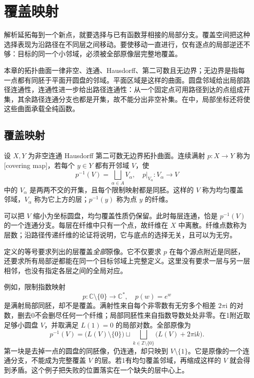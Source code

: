 \section{覆盖映射}
\label{b3:sec:1101}

解析延拓每到一个新点，就要选择与已有函数芽相接的局部分支。覆盖空间把这种选择表现为沿路径在不同层之间移动。要使移动一直进行，仅有逐点的局部逆还不够：目标的同一个小邻域，必须被全部原像层完整地覆盖。

\ProseParagraphBreak
本章的拓扑曲面一律非空、连通、Hausdorff、第二可数且无边界；无边界是指每一点都有同胚于平面开圆盘的邻域。平面区域是这样的曲面。圆盘邻域给出局部路径连通性，连通性进一步给出路径连通性：从一个固定点可用路径到达的点组成开集，其余路径连通分支也都是开集，故不能分出非空补集。在中，局部坐标还将使这些曲面承载全纯函数。

\subsection{覆盖映射}
\label{b3:subsec:110101}

\begin{definition}\label{b3:def:11-covering}
设 \(X,Y\) 为非空连通 Hausdorff 第二可数无边界拓扑曲面。连续满射 \(p:X\to Y\) 称为[covering map]，若每个 \(y\in Y\) 都有开邻域 \(V\)，使
\[
 p^{-1}(V)=\bigsqcup_{\alpha\in A}V_\alpha,
 \quad p|_{V_\alpha}:V_\alpha\longrightarrow V
\]
中的 \(V_\alpha\) 是两两不交的开集，且每个限制映射都是同胚。这样的 \(V\) 称为均匀覆盖邻域，\(V_\alpha\) 称为它上方的层；\(p^{-1}(y)\) 称为点 \(y\) 的纤维。
\end{definition}
可以把 \(V\) 缩小为坐标圆盘，均匀覆盖性质仍保留。此时每层连通，恰是 \(p^{-1}(V)\) 的一个连通分支。每层在纤维中只有一个点，故纤维在 \(X\) 中离散。纤维点数称为层数；沿路径传递纤维的论证将说明，它与底点的选择无关，且可以为无穷。

\ProseParagraphBreak
定义的等号要求列出的层覆盖\emph{全部}原像。它不仅要求 \(p\) 在每个源点附近是同胚，还要求所有局部逆都能在同一个目标邻域上完整定义。这里没有要求一层与另一层相邻，也没有指定各层之间的全局对应。

\ProseParagraphBreak
例如，限制指数映射
\[
 p:\mathbb C\setminus\{0\}\longrightarrow\mathbb C^*,
 \quad p(w)=e^w
\]
是满射局部同胚，却不是覆盖。满射性来自每个非零数有无穷多个相差 \(2\pi\mathrm i\) 的对数，删去0不会删尽任何一个纤维；局部同胚性来自指数导数处处非零。在1附近取足够小圆盘 \(V\)，并取满足 \(L(1)=0\) 的局部对数。全部原像为
\[
 p^{-1}(V)=\bigl(L(V)\setminus\{0\}\bigr)
 \sqcup\bigsqcup_{k\in\mathbb Z\setminus\{0\}}
       \bigl(L(V)+2\pi\mathrm i k\bigr).
\]
第一块是去掉一点的圆盘的同胚像，仍连通，却只映到 \(V\setminus\{1\}\)。它是原像的一个连通分支，不能成为完整覆盖 \(V\) 的层。若1有均匀覆盖邻域，再缩成这样的 \(V\) 就会得到矛盾。这个例子把失败的位置落实在一个缺失的层中心上。

